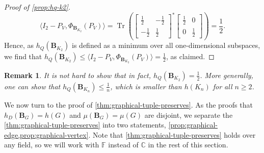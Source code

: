 \documentclass[11pt]{article}
\newtheorem{remark}[theorem]{Remark}
\theoremstyle{plain}
\numberwithin{equation}{section}
\theoremstyle{definition}
\DeclareMathOperator{\trace}{Tr}
\newcommand{\tuple}[1]{\mathbf{#1}}
\newcommand{\vB}{\tuple{B}}
\begin{document}
\begin{proof}[Proof of \cref{prop:hq-k2}]
    \[
        \langle I_2-P_V, \Phi_{\vB_{K_2}}(P_V)\rangle = \trace \left(
        \begin{bmatrix}
            \frac 12 & -\frac 12 \\ -\frac 12&\frac 12
        \end{bmatrix}^*
        \begin{bmatrix}
            \frac 12 &0\\0&\frac 12
        \end{bmatrix}
        \right)
        =\frac 12.
    \]
    Hence, as $h_Q(\vB_{K_2})$ is defined as a minimum over all one-dimensional subspaces, we find that $h_Q(\vB_{K_2}) \leq \langle I_2-P_V, \Phi_{\vB_{K_2}}(P_V)\rangle = \frac 12$, as claimed.
\end{proof}

\begin{remark}
It is not hard to show that in fact, $h_Q(\vB_{K_2})=\frac 12$. More generally, one can show that $h_Q(\vB_{K_n})\leq\frac 1n$, which is smaller than $h(K_n)$ for all $n\geq2$. 
\end{remark}
We now turn to the proof of \cref{thm:graphical-tuple-preserves}. As the proofs that $h_D(\vB_G)=h(G)$ and $\mu(\vB_G)=\mu(G)$ are disjoint, we separate the \cref{thm:graphical-tuple-preserves} into two statements, \cref{prop:graphical-edge,prop:graphical-vertex}.
Note that \cref{thm:graphical-tuple-preserves} holds over any field, so we will work with $\mathbb{F}$ instead of $\mathbb{C}$ in the rest of this section. 
\end{document}
